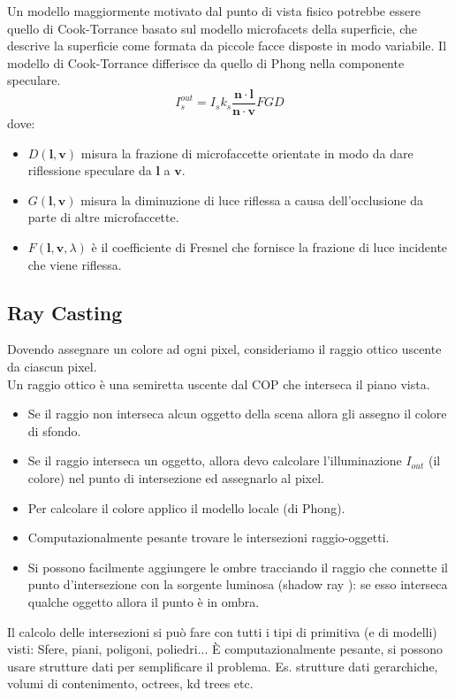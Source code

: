 \documentclass[a4paper, 10pt]{article}
\renewcommand{\vec}{\bm}
\begin{document}
		Un modello maggiormente motivato dal punto di vista fisico
		potrebbe essere quello di Cook-Torrance basato sul modello microfacets della superficie, che descrive la superficie come formata da piccole facce disposte in modo
		variabile.
		Il modello di Cook-Torrance differisce da quello di Phong nella
		componente speculare.
		\[
			I_s^{out} = I_s k_s \dfrac{\vec{n}\cdot\vec{l}}{\vec{n}\cdot\vec{v}}FGD
		\]
		dove:
		\begin{itemize}
			\item $ D(\vec{l}, \vec{v}) $ misura la frazione di microfaccette orientate in modo
			da dare riflessione speculare da $ \vec{l} $ a $ \vec{v} $.
			\item $ G(\vec{l}, \vec{v}) $ misura la diminuzione
			di luce riflessa a causa dell’occlusione da parte di altre
			microfaccette.
			\item $ F (\vec{l}, \vec{v}, \lambda) $ è il coefficiente di Fresnel che fornisce la
			frazione di luce incidente che viene riflessa.
		\end{itemize}
		
	\subsection{Ray Casting}
		Dovendo assegnare un colore ad ogni pixel, consideriamo il raggio ottico uscente da ciascun pixel.\\
		Un raggio ottico è una semiretta uscente dal COP che interseca
		il piano vista.
		\begin{itemize}
			\item Se il raggio non interseca alcun oggetto della scena allora gli assegno
			il colore di sfondo.
			\item Se il raggio interseca un oggetto, allora devo calcolare l’illuminazione
			$ I_{out} $ (il colore) nel punto di intersezione ed assegnarlo al pixel.
			\item Per calcolare il colore applico il modello locale (di Phong).
			\item Computazionalmente pesante trovare le intersezioni raggio-oggetti.
			\item Si possono facilmente aggiungere le ombre tracciando il raggio che
			connette il punto d’intersezione con la sorgente luminosa (shadow
			ray ): se esso interseca qualche oggetto allora il punto è in ombra.
		\end{itemize}
		Il calcolo delle intersezioni si può fare con tutti i tipi di primitiva (e di modelli) visti: Sfere, piani, poligoni, poliedri... È computazionalmente pesante, si possono usare strutture dati per semplificare il problema. Es. strutture dati gerarchiche, volumi di contenimento, octrees, kd trees etc.
		
\end{document}
